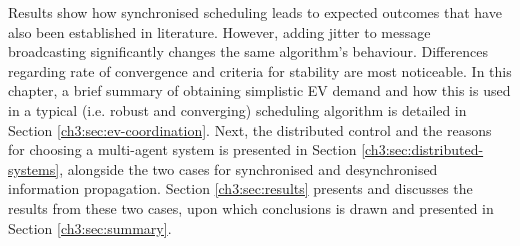 Results show how synchronised scheduling leads to expected outcomes that have also been established in literature.
However, adding jitter to message broadcasting significantly changes the same algorithm's behaviour.
Differences regarding rate of convergence and criteria for stability are most noticeable.
In this chapter, a brief summary of obtaining simplistic EV demand and how this is used in a typical (i.e. robust and converging) scheduling algorithm is detailed in Section \ref{ch3:sec:ev-coordination}.
Next, the distributed control and the reasons for choosing a multi-agent system is presented in Section \ref{ch3:sec:distributed-systems}, alongside the two cases for synchronised and desynchronised information propagation.
Section \ref{ch3:sec:results} presents and discusses the results from these two cases, upon which conclusions is drawn and presented in Section \ref{ch3:sec:summary}.












